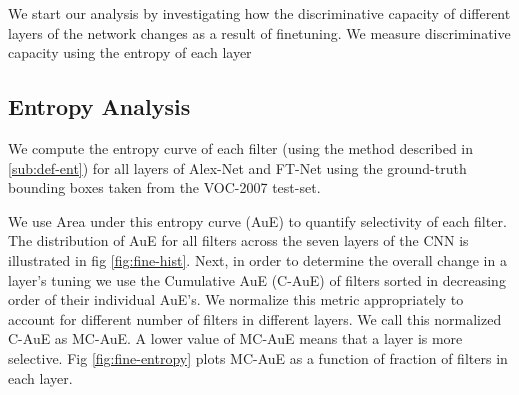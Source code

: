 \documentclass[runningheads]{llncs}
\begin{document}
We start our analysis by investigating how the discriminative capacity of different layers of the network changes as a result of finetuning. We measure discriminative capacity using the entropy of each layer  

\subsection{Entropy Analysis}
\label{sub:fine-entropy}
We compute the entropy  curve of each filter (using the method described in \ref{sub:def-ent}) for all layers of Alex-Net and FT-Net using the ground-truth bounding boxes taken from the VOC-2007 test-set. 

We use Area under this entropy curve (AuE) to quantify selectivity of each filter. The distribution of AuE for all filters across the seven layers of the CNN is illustrated in fig \ref{fig:fine-hist}. Next, in order to determine the overall change in a layer's tuning we use the Cumulative AuE (C-AuE) of filters sorted in decreasing order of their individual AuE's. We normalize this metric appropriately to account for different number of filters in different layers. We call this normalized C-AuE as MC-AuE. A lower value of MC-AuE means that a layer is more selective.  Fig \ref{fig:fine-entropy} plots MC-AuE as a function of fraction of filters in each layer. 
\end{document}
